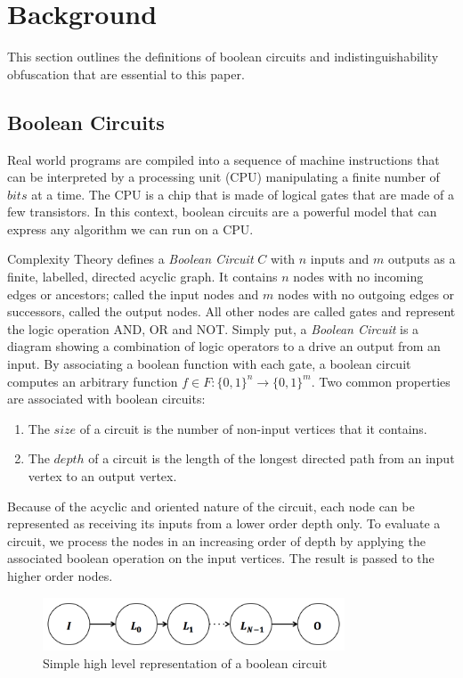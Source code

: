 \section{Background}
This section outlines the definitions of boolean circuits and indistinguishability obfuscation that are essential to this paper.
\par
\subsection{Boolean Circuits}
Real world programs are compiled into a sequence of machine instructions that can be interpreted by a processing unit (CPU) manipulating a finite number of $bits$ at a time. The CPU is a chip that is made of logical gates that are made of a few transistors. In this context, boolean circuits are a powerful model that can express any algorithm we can run on a CPU\cite{cpu}.
\par
Complexity Theory defines a \textit{Boolean Circuit} $C$ with $n$ inputs and $m$ outputs as a finite, labelled, directed acyclic graph. It contains $n$ nodes with no incoming edges or ancestors; called the input nodes and $m$ nodes with no outgoing edges or successors, called the output nodes. All other nodes are called gates and represent the logic operation AND, OR and NOT\cite{bool}. Simply put, a \textit{Boolean Circuit}  is a diagram showing a combination of logic operators to a drive an output from an input. By associating a boolean function with each gate, a boolean circuit computes an arbitrary function $f \in F :  \{0,1\}^n \to \{0,1\}^m$. Two common properties are associated with boolean circuits: 
\begin{enumerate}  
	\item The $size$ of a circuit is the number of non-input vertices that it contains. 
	\item The $depth$ of a circuit is the length of the longest directed path from an input vertex to an output vertex. 
\end{enumerate}
Because of the acyclic and oriented nature of the circuit, each node can be represented as receiving its inputs from a lower order depth only. To evaluate a circuit, we process the nodes in an increasing order of depth by applying the associated boolean operation on the input vertices. The result is passed to the higher order nodes.
\par
\begin{figure}[h]
	\center
	\includegraphics[width=0.8\textwidth]{img/graph.png}
	\caption{Simple high level representation of a boolean circuit}
\end{figure}
